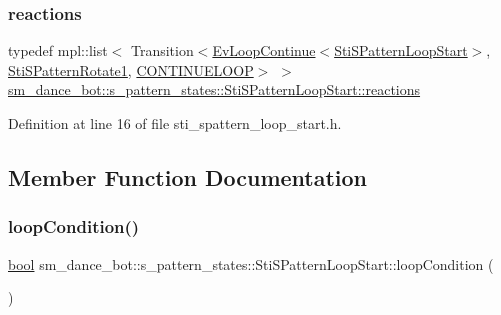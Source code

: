 \subsubsection{\texorpdfstring{reactions}{reactions}}
{\footnotesize\ttfamily typedef mpl\+::list$<$ Transition$<$\hyperlink{structsmacc_1_1default__events_1_1EvLoopContinue}{Ev\+Loop\+Continue}$<$\hyperlink{structsm__dance__bot_1_1s__pattern__states_1_1StiSPatternLoopStart}{Sti\+S\+Pattern\+Loop\+Start}$>$, \hyperlink{structsm__dance__bot_1_1s__pattern__states_1_1StiSPatternRotate1}{Sti\+S\+Pattern\+Rotate1}, \hyperlink{structsmacc_1_1default__transition__tags_1_1CONTINUELOOP}{C\+O\+N\+T\+I\+N\+U\+E\+L\+O\+OP}$>$ $>$ \hyperlink{structsm__dance__bot_1_1s__pattern__states_1_1StiSPatternLoopStart_a3ea4b54d39b71c82916be6e636e59cca}{sm\+\_\+dance\+\_\+bot\+::s\+\_\+pattern\+\_\+states\+::\+Sti\+S\+Pattern\+Loop\+Start\+::reactions}}



Definition at line 16 of file sti\+\_\+spattern\+\_\+loop\+\_\+start.\+h.



\subsection{Member Function Documentation}
\mbox{\label{structsm__dance__bot_1_1s__pattern__states_1_1StiSPatternLoopStart_a6ee8949dad84ea1906ec16f209bac199}} 
\subsubsection{\texorpdfstring{loop\+Condition()}{loopCondition()}}
{\footnotesize\ttfamily \hyperlink{classbool}{bool} sm\+\_\+dance\+\_\+bot\+::s\+\_\+pattern\+\_\+states\+::\+Sti\+S\+Pattern\+Loop\+Start\+::loop\+Condition (\begin{DoxyParamCaption}{ }\end{DoxyParamCaption})\hspace{0.3cm}{\ttfamily [inline]}}



